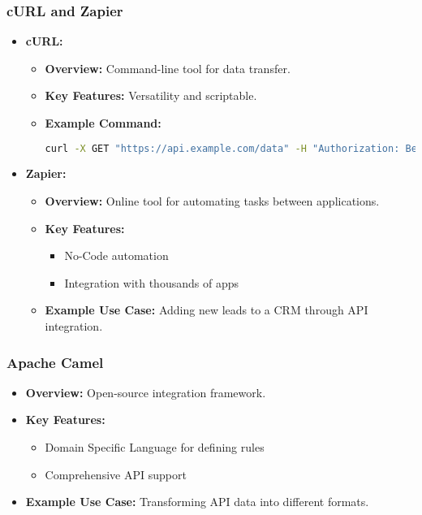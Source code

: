 \documentclass[aspectratio=169]{beamer}
\begin{document}
\begin{frame}[fragile]
    \frametitle{cURL and Zapier}
    \begin{itemize}
        \item \textbf{cURL:}
        \begin{itemize}
            \item \textbf{Overview:} Command-line tool for data transfer.
            \item \textbf{Key Features:} Versatility and scriptable.
            \item \textbf{Example Command:}
            \begin{lstlisting}[language=bash]
curl -X GET "https://api.example.com/data" -H "Authorization: Bearer YOUR_TOKEN"
            \end{lstlisting}
        \end{itemize}

        \item \textbf{Zapier:}
        \begin{itemize}
            \item \textbf{Overview:} Online tool for automating tasks between applications.
            \item \textbf{Key Features:}
            \begin{itemize}
                \item No-Code automation
                \item Integration with thousands of apps
            \end{itemize}
            \item \textbf{Example Use Case:} Adding new leads to a CRM through API integration.
        \end{itemize}
    \end{itemize}
\end{frame}

\begin{frame}[fragile]
    \frametitle{Apache Camel}
    \begin{itemize}
        \item \textbf{Overview:} Open-source integration framework.
        \item \textbf{Key Features:}
        \begin{itemize}
            \item Domain Specific Language for defining rules
            \item Comprehensive API support
        \end{itemize}
        \item \textbf{Example Use Case:} Transforming API data into different formats.
    \end{itemize}
\end{frame}
\end{document}
